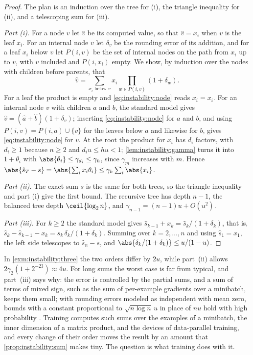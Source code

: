 \begin{refsection}
\begin{proof}
The plan is an induction over the tree for (i), the triangle inequality for (ii), and a telescoping sum for (iii).

\emph{Part (i).} For a node $v$ let $\hat v$ be its computed value, so that $\hat v=x_i$ when $v$ is the leaf $x_i$. For an internal node $v$ let $\delta_v$ be the rounding error of its addition, and for a leaf $x_i$ below $v$ let $P(i,v)$ be the set of internal nodes on the path from $x_i$ up to $v$, with $v$ included and $P(i,x_i)$ empty. We show, by induction over the nodes with children before parents, that
\begin{equation}\label{eq:instability:node}
  \hat v=\sum_{x_i\text{ below }v}x_i\prod_{w\in P(i,v)}(1+\delta_w).
\end{equation}
For a leaf the product is empty and \eqref{eq:instability:node} reads $x_i=x_i$. For an internal node $v$ with children $a$ and $b$, the standard model gives $\hat v=(\hat a+\hat b)(1+\delta_v)$; inserting \eqref{eq:instability:node} for $a$ and $b$, and using $P(i,v)=P(i,a)\cup\{v\}$ for the leaves below $a$ and likewise for $b$, gives \eqref{eq:instability:node} for $v$. At the root the product for $x_i$ has $d_i$ factors, with $d_i\ge1$ because $n\ge2$ and $d_iu\le hu<1$; \cref{lem:instability:gamma} turns it into $1+\theta_i$ with $\abs{\theta_i}\le\gamma_{d_i}\le\gamma_h$, since $\gamma_m$ increases with $m$. Hence $\abs{\hat s_T-s}=\abs{\sum_ix_i\theta_i}\le\gamma_h\sum_i\abs{x_i}$.

\emph{Part (ii).} The exact sum $s$ is the same for both trees, so the triangle inequality and part (i) give the first bound. The recursive tree has depth $n-1$, the balanced tree depth $\ceil{\log_2n}$, and $\gamma_{n-1}=(n-1)u+O(u^2)$.

\emph{Part (iii).} For $k\ge2$ the standard model gives $\hat s_{k-1}+x_k=\hat s_k/(1+\delta_k)$, that is, $\hat s_k-\hat s_{k-1}-x_k=\hat s_k\,\delta_k/(1+\delta_k)$. Summing over $k=2,\dots,n$ and using $\hat s_1=x_1$, the left side telescopes to $\hat s_n-s$, and $\abs{\delta_k/(1+\delta_k)}\le u/(1-u)$.
\end{proof}

In \cref{exm:instability:three} the two orders differ by $2u$, while part~(ii) allows $2\gamma_2(1+2^{-23})\approx4u$. For long sums the worst case is far from typical, and part~(iii) says why: the error is controlled by the partial sums, and a sum of terms of mixed sign, such as the sum of per-example gradients over a minibatch, keeps them small; with rounding errors modeled as independent with mean zero, bounds with a constant proportional to $\sqrt{n\log n}\,u$ in place of $nu$ hold with high probability \parencite{HighamMary2019}. Training computes such sums over the examples of a minibatch, the inner dimension of a matrix product, and the devices of data-parallel training, and every change of their order moves the result by an amount that \cref{prop:instability:sum} makes tiny. The question is what training does with it.


\end{refsection}
